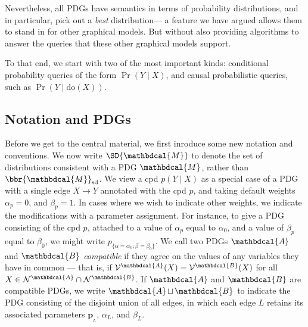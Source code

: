 \documentclass{article}
\theoremstyle{plain}
\theoremstyle{definition}
\theoremstyle{remark}
\newcommand\mat[1]{\mathbf{#1}}
\newcommand{\bp}[1][L]{\mat{p}_{\!_{#1}\!}}
\newcommand{\V}{\mathcal V}
\newcommand{\N}{\mathcal N}
\newcommand{\dg}[1]{\mathbdcal{#1}}
\newcommand\smid{\!\mid\!}
\newcommand\MAP{\mathrm{MAP}}
\DeclareMathOperator{\bundle}{\sqcup}
\newcommand\ado{\mathrm{do}}
\begin{document}
Nevertheless, all PDGs have semantics in terms of probability distributions, and 
in particular, pick out a \emph{best} distribution---%
a feature we have argued allows them to stand in for other graphical models.
But without also providing algorithms to answer the queries that 
these other graphical models support.


To that end, we start with two of the most important kinds: 
	conditional probability queries of the form $\Pr(Y \smid X)$, 
	and causal probabilistic queries, such as $\Pr(Y \smid \ado(X))$.
	







\subsection*{Notation and PDGs}
Before we get to the central material, we first inroduce some new notation and conventions. We now write $\SD{\dg M}$ to denote
the set of distributions consistent with a PDG $\dg M$, rather than $\bbr{\dg M}_{\textrm{sd}}$. We view a cpd $p(Y \mid X)$ as a special case of a PDG with
a single edge $X \to Y$ annotated with the cpd $p$, and taking 
default weights $\alpha_p = 0$, and $\beta_p = 1$. In cases where we wish
to indicate other weights, we indicate the modifications with a parameter
assignment. For instance, to give a PDG consisting of the cpd $p$, attached to
a value of $\alpha_p$ equal to $\alpha_0$, and 
a value of $\beta_p$ equal to $\beta_0$, we might write
$ p_{\{\alpha=\alpha_0;\beta = \beta_0\}} $.
%
We call two PDGs $\dg A$ and $\dg B$ \emph{compatible} if they agree
on the values of any variables they have in common --- that is, if
$\V^{\dg A}(X) = \V^{\dg B}(X)$ for all $X \in \N^{\dg A} \cap \N^{\dg B}$. 
%
If $\dg A$ and $\dg B$ are compatible PDGs, we write $\dg A \bundle \dg B$ to indicate the PDG consisting of the disjoint union of all edges, in which each edge $L$ retains its associated parameters $\bp$, $\alpha_L$, and $\beta_L$.
\end{document}
